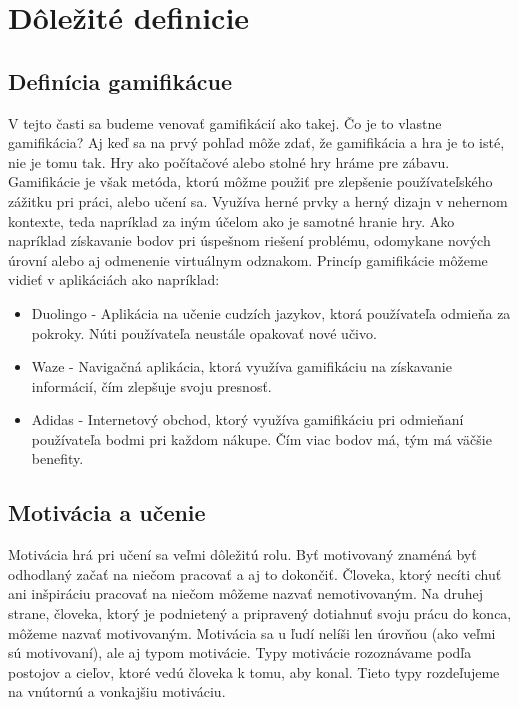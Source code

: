 \documentclass[10pt,oneside,slovak,a4paper]{article}
\begin{document}
\section{Dôležité definicie} \label{definicie}
\subsection{Definícia gamifikácue} \label{gamifikacia}
V tejto časti sa budeme venovať gamifikácií ako takej. Čo je to vlastne gamifikácia? Aj keď sa na prvý pohľad môže zdať, že gamifikácia a hra je to isté, nie je tomu tak. Hry ako počítačové alebo stolné hry hráme pre zábavu. Gamifikácie je však metóda, ktorú môžme použiť pre zlepšenie používateľského zážitku pri práci, alebo učení sa. Využíva herné prvky a herný dizajn v nehernom kontexte, teda napríklad za iným účelom ako je samotné hranie hry. Ako napríklad získavanie bodov pri úspešnom riešení problému, odomykane nových úrovní alebo aj odmenenie virtuálnym odznakom. Princíp gamifikácie môžeme vidieť v aplikáciách ako napríklad:

\begin{itemize}
    \item Duolingo - Aplikácia na učenie cudzích jazykov, ktorá používateľa odmieňa za pokroky. Núti používateľa neustále opakovať nové učivo.
    \item Waze - Navigačná aplikácia, ktorá využíva gamifikáciu na získavanie informácií, čím zlepšuje svoju presnosť.
    \item Adidas - Internetový obchod, ktorý využíva gamifikáciu pri odmieňaní používateľa bodmi pri každom nákupe. Čím viac bodov má, tým má väčšie benefity.
\end{itemize}



\subsection{Motivácia a učenie} \label{motivacia}
Motivácia hrá pri učení sa veľmi dôležitú rolu. Byť motivovaný znaméná byť odhodlaný začať na niečom pracovať a aj to dokončiť. Človeka, ktorý necíti chuť ani inšpiráciu pracovať na niečom môžeme nazvať nemotivovaným. Na druhej strane, človeka, ktorý je podnietený a pripravený dotiahnuť svoju prácu do konca, môžeme nazvať motivovaným. Motivácia sa u ľudí nelíši len úrovňou (ako veľmi sú motivovaní), ale aj typom motivácie. Typy motivácie rozoznávame podľa postojov a cieľov, ktoré vedú človeka k tomu, aby konal. Tieto typy rozdeľujeme na vnútornú a vonkajšiu motiváciu. ~\cite{ryan2000intrinsic}
\end{document}
